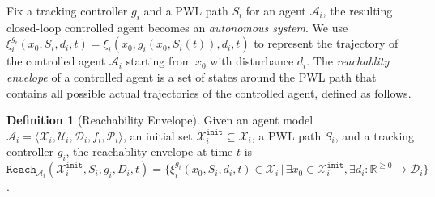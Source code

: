 \documentclass[letterpaper]{article} %
\theoremstyle{definition}
\newtheorem{definition}{Definition}
\newcommand{\reals}{\mathbb{R}}
\newcommand{\nnreals}{\reals^{\ge 0}}
\begin{document}
Fix a tracking controller $g_i$ and a PWL path $S_i$ for an agent $\mathcal{A}_i$, the resulting closed-loop controlled agent becomes an {\em autonomous system}. We use  $\xi^{g_i}_i(x_0, S_i, d_i, t)=\xi_i(x_0, g_i(x_0, S_i(t)), d_i, t)$ to represent the trajectory of the controlled agent $\mathcal{A}_i$ starting from $x_0$ with disturbance $d_i$. The {\em reachablity envelope} of a controlled agent is a set of states around the PWL path that contains all possible actual trajectories of the controlled agent, defined as follows.
\begin{definition}[Reachability Envelope]
    Given an agent model $\mathcal{A}_i = \langle  \mathcal{X}_i, \mathcal{U}_i, \mathcal{D}_i, f_i, \mathcal{P}_i\rangle$, an initial set $\mathcal{X}^\texttt{init}_i \subseteq \mathcal{X}_i$, a PWL path $S_i$, and a tracking controller $g_i$, the reachablity envelope  at time $t$ is %
    $\texttt{Reach}_{\mathcal{A}_i}(\mathcal{X}^\texttt{init}_i,S_i, g_i,  D_i,  t) = 
    \{ \xi^{g_i}_i(x_0,  S_i, d_i, t) \in \mathcal{X}_i \,|\, \exists x_0 \in \mathcal{X}^\texttt{init}_i, \exists d_i: \nnreals \rightarrow \mathcal{D}_i \}$.
\end{definition}
\end{document}
